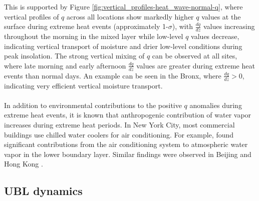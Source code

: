 \documentclass[11pt,a4paper]{article}
\begin{document}
\\ \\
This is supported by Figure \ref{fig:vertical_profiles-heat_wave-normal-q}, where vertical profiles of $q$ across all locations show markedly higher $q$ values at the surface during extreme heat events (approximately 1-$\sigma$), with $\frac{dq}{dz}$ values increasing throughout the morning in the mixed layer while low-level $q$ values decrease, indicating vertical transport of moisture and drier low-level conditions during peak insolation. The strong vertical mixing of $q$ can be observed at all sites, where late morning and early afternoon $\frac{dq}{dz}$ values are greater during extreme heat events than normal days. An example can be seen in the Bronx, where $\frac{dq}{dz} > 0$, indicating very efficient vertical moisture transport. 
\\ \\
In addition to environmental contributions to the positive $q$ anomalies during extreme heat events, it is known that anthropogenic contribution of water vapor increases during extreme heat periods. In New York City, most commercial buildings use chilled water coolers for air conditioning. For example, \citet{gutierrez2015} found significant contributions from the air conditioning system to atmospheric water vapor in the lower boundary layer. Similar findings were observed in Beijing \citep{yu2019} and Hong Kong \citep{wang2018}.

\subsection{UBL dynamics}
\end{document}
